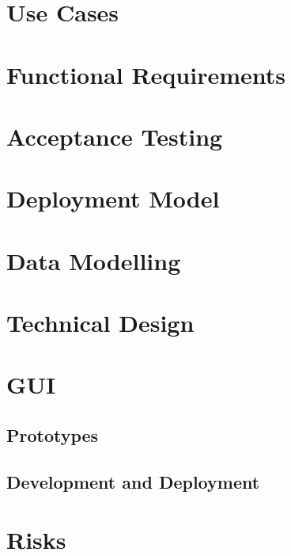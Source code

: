 \documentclass{article}
\begin{document}
	\section{Use Cases}
	
	\pagebreak
	
	\section{Functional Requirements}
	
	\pagebreak
	
	\section{Acceptance Testing}
	
	\pagebreak
	
	\section{Deployment Model}
	
	\pagebreak
	
	\section{Data Modelling}
	
	\pagebreak
	
	\section{Technical Design}
	
	\pagebreak
	
	\section{GUI}
	\subsection{Prototypes}
	
	
	\subsection{Development and Deployment}
	
	
	\pagebreak
	
	\section{Risks}
	
	\pagebreak
	
\end{document}
